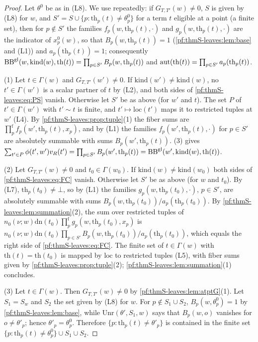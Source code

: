 \begin{proof}
Let $\theta^0$ be as in (L8). We use repeatedly: if $G_{T,T'}(w)\ne0$, $S$ is given by (L8) for $w$, and
$S'=S\cup\{p:\mathrm{th}_p(t)\ne\theta^0_p\}$ for a term $t$ eligible at a point (a finite set), then for $p\notin S'$ the families
$f_p(w,\mathrm{th}_p(t),\cdot)$ and $g_p(w,\mathrm{th}_p(t),\cdot)$ are the indicator of $x^0_p(w)$, so that $B_p(w,\mathrm{th}_p(t))=1$
(\cref{pf:thmS-leaves:lem:base} and (L1)) and $a_p(\mathrm{th}_p(t))=1$; consequently
$\mathrm{BB}^{\mathrm{gl}}(w,\mathrm{kind}(w),\mathrm{th}(t))=\prod_{p\in S'}B_p(w,\mathrm{th}_p(t))$ and
$\mathrm{aut}(\mathrm{th}(t))=\prod_{p\in S'}a_p(\mathrm{th}_p(t))$.

(1) Let $t\in\Gamma(w)$ and $G_{T,T'}(w')\ne0$. If $\mathrm{kind}(w')\ne\mathrm{kind}(w)$, no $t'\in\Gamma(w')$ is a scalar partner of $t$
by (L2), and both sides of \eqref{pf:thmS-leaves:eq:PS} vanish. Otherwise let $S'$ be as above (for $w'$ and $t$). The set $P$ of
$t'\in\Gamma(w')$ with $t'\sim t$ is finite, and $t'\mapsto\mathrm{loc}(t')$ maps it to restricted tuples at $w'$ (L4). By
\cref{pf:thmS-leaves:prop:tuple}(1) the fiber sums are $\prod^{\mathrm f}_pf_p(w',\mathrm{th}_p(t),x_p)$, and by (L1) the families
$f_p(w',\mathrm{th}_p(t),\cdot)$ for $p\in S'$ are absolutely summable with sums $B_p(w',\mathrm{th}_p(t))$.
(3) gives
$\sum_{t'\in P}\phi(t',w')v_R(t')=\prod_{p\in S'}B_p(w',\mathrm{th}_p(t))=\mathrm{BB}^{\mathrm{gl}}(w',\mathrm{kind}(w),\mathrm{th}(t))$.

(2) Let $G_{T,T'}(w)\ne0$ and $t_0\in\Gamma(w_0)$. If $\mathrm{kind}(w)\ne\mathrm{kind}(w_0)$ both sides of \eqref{pf:thmS-leaves:eq:FC}
vanish. Otherwise let $S'$ be as above (for $w$ and $t_0$). By (L7), $\mathrm{th}_p(t_0)\ne\bot$, so by (L1) the families
$g_p(w,\mathrm{th}_p(t_0),\cdot)$, $p\in S'$, are absolutely summable with sums $B_p(w,\mathrm{th}_p(t_0))/a_p(\mathrm{th}_p(t_0))$. By
\cref{pf:thmS-leaves:lem:summation}(2), the sum over restricted tuples of $n_0(\nu;w)\mathrm{dn}(t_0)\prod^{\mathrm f}_pg_p(w,\mathrm{th}_p(t_0),x_p)$
is $n_0(\nu;w)\mathrm{dn}(t_0)\prod_{p\in S'}B_p(w,\mathrm{th}_p(t_0))/a_p(\mathrm{th}_p(t_0))$, which equals the right side of
\eqref{pf:thmS-leaves:eq:FC}. The finite set of $t\in\Gamma(w)$ with $\mathrm{th}(t)=\mathrm{th}(t_0)$ is mapped by $\mathrm{loc}$ to restricted
tuples (L5), with fiber sums given by \cref{pf:thmS-leaves:prop:tuple}(2); \cref{pf:thmS-leaves:lem:summation}(1) concludes.

(3) Let $t\in\Gamma(w)$. Then $G_{T,T'}(w)\ne0$ by \cref{pf:thmS-leaves:lem:atptG}(1). Let $S_1=S_w$ and $S_2$ the set given by (L8) for
$w$. For $p\notin S_1\cup S_2$, $B_p(w,\theta^0_p)=1$ by \cref{pf:thmS-leaves:lem:base}, while $\mathrm{Unr}(\theta',S_1,w)$ says that $B_p(w,o)$
vanishes for $o\ne\theta'_p$; hence $\theta'_p=\theta^0_p$. Therefore $\{p:\mathrm{th}_p(t)\ne\theta'_p\}$ is contained in the finite set
$\{p:\mathrm{th}_p(t)\ne\theta^0_p\}\cup S_1\cup S_2$.
\end{proof}

